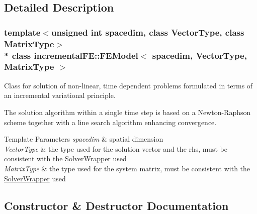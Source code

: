 \subsection{Detailed Description}
\subsubsection*{template$<$unsigned int spacedim, class Vector\+Type, class Matrix\+Type$>$\\*
class incremental\+F\+E\+::\+F\+E\+Model$<$ spacedim, Vector\+Type, Matrix\+Type $>$}

Class for solution of non-\/linear, time dependent problems formulated in terms of an incremental variational principle.

The solution algorithm within a single time step is based on a Newton-\/\+Raphson scheme together with a line search algorithm enhancing convergence.


\begin{DoxyTemplParams}{Template Parameters}
{\em spacedim} & spatial dimension\\
\hline
{\em Vector\+Type} & the type used for the solution vector and the rhs, must be consistent with the \hyperlink{classincremental_f_e_1_1_solver_wrapper}{Solver\+Wrapper} used\\
\hline
{\em Matrix\+Type} & the type used for the system matrix, must be consistent with the \hyperlink{classincremental_f_e_1_1_solver_wrapper}{Solver\+Wrapper} used \\
\hline
\end{DoxyTemplParams}


\subsection{Constructor \& Destructor Documentation}
